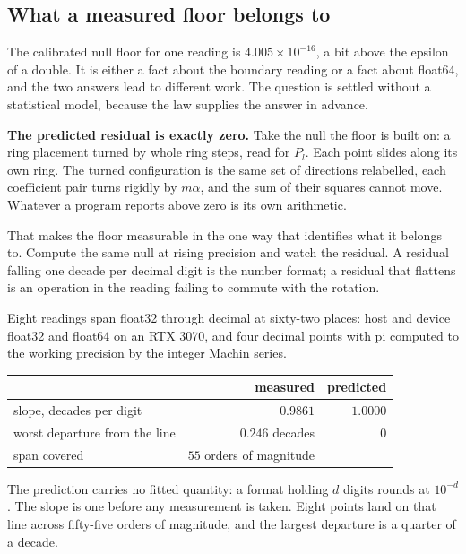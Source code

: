 \subsection{What a measured floor belongs to}
\label{sec:precisionfloor}

The calibrated null floor for one reading is \(4.005 \times 10^{-16}\), a bit above the epsilon of a double. It is either a fact about the boundary reading or a fact about float64, and the two answers lead to different work. The question is settled without a statistical model, because the law supplies the answer in advance.

\textbf{The predicted residual is exactly zero.} Take the null the floor is built on: a ring placement turned by whole ring steps, read for \(P_l\). Each point slides along its own ring. The turned configuration is the same set of directions relabelled, each coefficient pair turns rigidly by \(m\alpha\), and the sum of their squares cannot move. Whatever a program reports above zero is its own arithmetic.

That makes the floor measurable in the one way that identifies what it belongs to. Compute the same null at rising precision and watch the residual. A residual falling one decade per decimal digit is the number format; a residual that flattens is an operation in the reading failing to commute with the rotation.

Eight readings span float32 through decimal at sixty-two places: host and device float32 and float64 on an RTX 3070, and four decimal points with pi computed to the working precision by the integer Machin series.

\begin{center}
\begin{tabular}{lrr}
\toprule
 & measured & predicted \\
\midrule
slope, decades per digit & \(0.9861\) & \(1.0000\) \\
worst departure from the line & \(0.246\) decades & \(0\) \\
span covered & \(55\) orders of magnitude & \textemdash{} \\
\bottomrule
\end{tabular}
\end{center}

The prediction carries no fitted quantity: a format holding \(d\) digits rounds at \(10^{-d}\). The slope is one before any measurement is taken. Eight points land on that line across fifty-five orders of magnitude, and the largest departure is a quarter of a decade.

